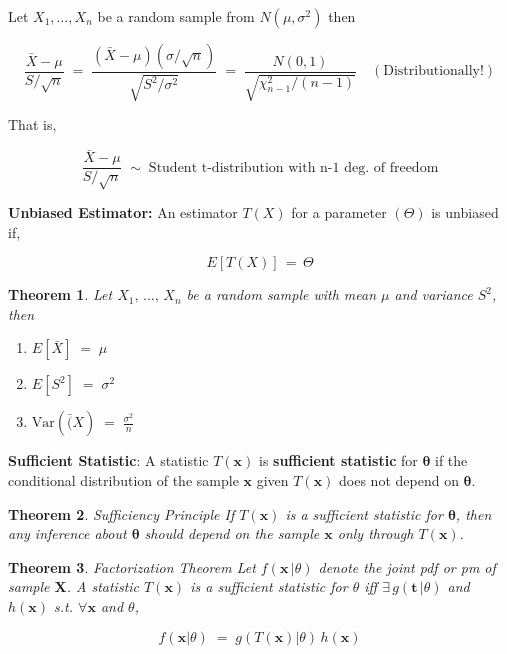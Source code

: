 \documentclass[10pt]{article}
\newtheorem{theorem}{Theorem}
\numberwithin{equation}{section}
\begin{document}
\noindent
Let $X_1, \ldots, X_n$ be a random sample from $N(\mu, \sigma^{2})$ then

$$\frac{\bar{X} - \mu}{S/\sqrt{n}}
 \; = \; 
 \frac{(\bar{X} - \mu)(\sigma / \sqrt{n}) }{\sqrt{S^{2}/\sigma^{2}}}
 \; = \;
 \frac{N(0,1)}{\sqrt{\chi^{2}_{n-1} / (n-1)}} \quad (\text{Distributionally!})
 $$ 

\noindent
That is,

$$\frac{\bar{X} - \mu}{S/\sqrt{n}} \; \sim \; \text{Student t-distribution with n-1 deg. of freedom} $$


\noindent
\textbf{Unbiased Estimator:} An estimator $T(X)$ for a parameter $(\Theta)$ is unbiased if,

$$ E[T(X)] \, = \, \Theta$$

\noindent
\begin{theorem}
Let $X_1, \, \ldots, \, X_n$ be a random sample with mean $\mu$ and variance $S^2$, then
\begin{enumerate}
\item $E[ \bar{X} ] \; = \; \mu$ 
\item $E[ S^{2} ] \; = \; \sigma^2$ 
\item $\text{Var}(\bar(X) \; = \; \frac{\sigma^2}{n}$
\end{enumerate}

\end{theorem}


\noindent
\textbf{Sufficient Statistic}: A statistic $T(\textbf{x})$ is \textbf{sufficient statistic} for $\boldsymbol \theta$ if the conditional distribution of the sample $\textbf{x}$ given $T(\textbf{x})$ does not depend on $\boldsymbol \theta$.


\noindent
\begin{theorem}{Sufficiency Principle}
If $T(\textbf{x})$ is a sufficient statistic for $\boldsymbol \theta$, then any inference about $\boldsymbol \theta$ should depend on the sample $\textbf{x}$ only through $T(\textbf{x})$.
\end{theorem}

\noindent
\begin{theorem}{Factorization Theorem}
Let $f(\textbf{x}  \, \vert \theta)$ denote the joint pdf or pm of sample $\textbf{X}$.  A statistic $T(\textbf{x})$ is a sufficient statistic for $\theta$ iff $\exists \, g(\textbf{t} \, \vert \theta)$ and $h(\textbf{x})$ s.t. $\forall \textbf{x}$ and $\theta$,

$$ f(\textbf{x} | \theta) \; = \; g(T(\textbf{x}) | \theta) \, h (\textbf{x}) $$
\end{theorem}
\end{document}
